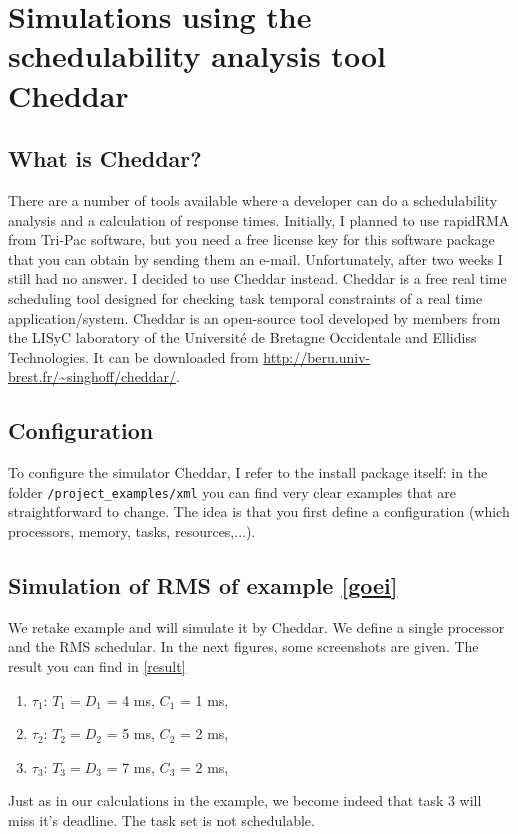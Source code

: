 \documentclass[a4paper,12pt]{article}
\theoremstyle{definition}
\begin{document}
\section{Simulations using the schedulability analysis tool Cheddar}
\subsection{What is Cheddar?}
There are a number of tools available where a developer can do a schedulability 
analysis and a calculation of response times. Initially, I planned to use 
rapidRMA from Tri-Pac software, but you need a free license key for this 
software package that you can obtain by sending them an e-mail. Unfortunately, 
after two weeks I still had no answer. I decided to use Cheddar instead. Cheddar 
is a free real time scheduling tool designed for checking task temporal 
constraints of a real time application/system. Cheddar is an open-source tool 
developed by members from the LISyC laboratory of the Universit\'{e} de Bretagne 
Occidentale and Ellidiss Technologies. It can be downloaded from
\url{http://beru.univ-brest.fr/~singhoff/cheddar/}.
\subsection{Configuration}
To configure the simulator Cheddar, I refer to the install package itself: in 
the folder \verb"/project_examples/xml" you can find very clear examples that 
are straightforward to change. The idea is that you first define a configuration 
(which processors, memory, tasks, resources,...). 
\subsection{Simulation of RMS of example \ref{goei}}
We retake example \label{goei} and will simulate it by Cheddar. We define a single processor 
and the RMS schedular. In the next figures, some screenshots are given. The 
result you can find in \ref{result}

\begin{enumerate}
    \item $\tau_1$: $T_1 = D_1$ = 4 ms,  $C_1$ = 1 ms,
    \item $\tau_2$: $T_2 = D_2$ = 5 ms,  $C_2$ = 2 ms,
    \item  $\tau_3$: $T_3 = D_3$ = 7 ms,   $C_3$ = 2 ms,
  \end{enumerate}
Just as in our calculations in the example, we become indeed that task 3 will miss it's deadline. The task set is not 
schedulable.
\end{document}
